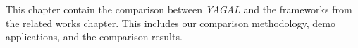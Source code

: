 This chapter contain the comparison between \textit{YAGAL} and the frameworks from the related works chapter. This includes our comparison methodology, demo applications, and the comparison results.
 